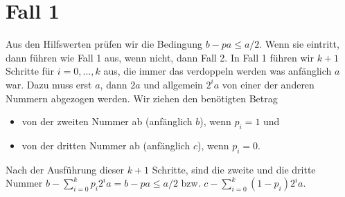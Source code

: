 \section{Fall 1} \label{case-1}
Aus den Hilfswerten prüfen wir die Bedingung $b-pa \leq a/2$. Wenn sie eintritt, dann führen wie Fall 1 aus, wenn nicht, dann Fall 2. 
In Fall 1 führen wir $k+1$ Schritte für $i=0, ..., k$ aus, die immer das verdoppeln werden was anfänglich $a$ war. Dazu muss erst $a$, dann $2a$ und allgemein $2^ia$ von einer der anderen Nummern abgezogen werden. 
Wir ziehen den benötigten Betrag 
\begin{itemize}
    \item von der zweiten Nummer ab (anfänglich $b$), wenn $p_i = 1$ und
    \item von der dritten Nummer ab (anfänglich $c$), wenn $p_i = 0$.
\end{itemize}

Nach der Ausführung dieser $k+1$ Schritte, sind die zweite und die dritte Nummer $b- \sum_{i=0}^{k} p_i2^ia = b-pa \leq a/2$ bzw. $c- \sum_{i=0}^{k} (1-p_i)2^ia$.
